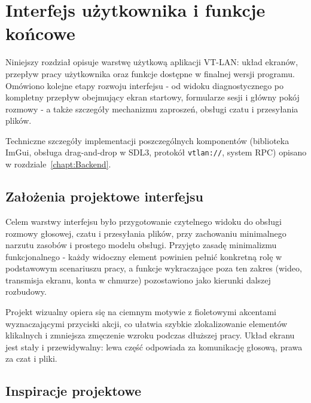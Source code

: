 \chapter{Interfejs użytkownika i funkcje końcowe}
\label{ch:interfejs_uzytkownika}
\raggedbottom
Niniejszy rozdział opisuje warstwę użytkową aplikacji VT-LAN: układ
ekranów, przepływ pracy użytkownika oraz funkcje dostępne w finalnej
wersji programu. Omówiono kolejne etapy rozwoju interfejsu - od widoku
diagnostycznego po kompletny przepływ obejmujący ekran startowy, formularze
sesji i główny pokój rozmowy - a także szczegóły mechanizmu zaproszeń,
obsługi czatu i przesyłania plików.

Techniczne szczegóły implementacji poszczególnych komponentów
(biblioteka ImGui, obsługa drag-and-drop w SDL3, protokół \texttt{vtlan://},
system RPC) opisano w rozdziale~\ref{chapt:Backend}.

\section{Założenia projektowe interfejsu}
\label{sec:zalozenia_ui}

Celem warstwy interfejsu było przygotowanie czytelnego widoku do obsługi
rozmowy głosowej, czatu i przesyłania plików, przy zachowaniu minimalnego
narzutu zasobów i prostego modelu obsługi. Przyjęto zasadę minimalizmu
funkcjonalnego - każdy widoczny element powinien pełnić konkretną rolę
w podstawowym scenariuszu pracy, a funkcje wykraczające poza ten zakres
(wideo, transmisja ekranu, konta w chmurze) pozostawiono jako kierunki
dalszej rozbudowy.

Projekt wizualny opiera się na ciemnym motywie z fioletowymi akcentami
wyznaczającymi przyciski akcji, co ułatwia szybkie zlokalizowanie
elementów klikalnych i zmniejsza zmęczenie wzroku podczas dłuższej pracy.
Układ ekranu jest stały i przewidywalny: lewa część odpowiada za
komunikację głosową, prawa za czat i pliki.

\section{Inspiracje projektowe}
\label{sec:inspiracje_ui}

